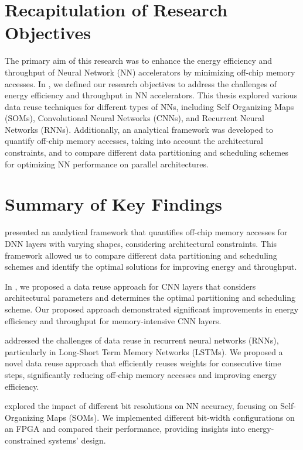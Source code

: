 \section{Recapitulation of Research Objectives}
The primary aim of this research was to enhance the energy efficiency and throughput of Neural Network (NN) accelerators by minimizing off-chip memory accesses. In , we defined our research objectives to address the challenges of energy efficiency and throughput in NN accelerators. This thesis explored various data reuse techniques for different types of NNs, including Self Organizing Maps (SOMs), Convolutional Neural Networks (CNNs), and Recurrent Neural Networks (RNNs). Additionally, an analytical framework was developed to quantify off-chip memory accesses, taking into account the architectural constraints, and to compare different data partitioning and scheduling schemes for optimizing NN performance on parallel architectures. 

\section{Summary of Key Findings}
 presented an analytical framework that quantifies off-chip memory accesses for DNN layers with varying shapes, considering architectural constraints. This framework allowed us to compare different data partitioning and scheduling schemes and identify the optimal solutions for improving energy and throughput.

In , we proposed a data reuse approach for CNN layers that considers architectural parameters and determines the optimal partitioning and scheduling scheme. Our proposed approach demonstrated significant improvements in energy efficiency and throughput for memory-intensive CNN layers.

 addressed the challenges of data reuse in recurrent neural networks (RNNs), particularly in Long-Short Term Memory Networks (LSTMs). We proposed a novel data reuse approach that efficiently reuses weights for consecutive time steps, significantly reducing off-chip memory accesses and improving energy efficiency.

 explored the impact of different bit resolutions on NN accuracy, focusing on Self-Organizing Maps (SOMs). We implemented different bit-width configurations on an FPGA and compared their performance, providing insights into energy-constrained systems' design.

